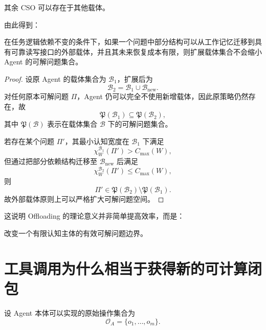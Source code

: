 其余 CSO 可以存在于其他载体。

由此得到：

\begin{theorem}[载体扩展定理]
在任务逻辑依赖不变的条件下，如果一个问题中部分结构可以从工作记忆迁移到具有可靠读写接口的外部载体，并且其未来恢复成本有限，则扩展载体集合不会缩小 Agent 的可解问题集合。
\end{theorem}

\begin{proof}
设原 Agent 的载体集合为 $\mathcal B_1$，扩展后为
\begin{equation}
\mathcal B_2
=
\mathcal B_1\cup\mathcal B_{\mathrm{new}}.
\end{equation}
对任何原本可解问题 $\Pi$，Agent 仍可以完全不使用新增载体，因此原策略仍然存在，故
\begin{equation}
\mathfrak P(\mathcal B_1)
\subseteq
\mathfrak P(\mathcal B_2),
\end{equation}
其中 $\mathfrak P(\mathcal B)$ 表示在载体集合 $\mathcal B$ 下的可解问题集合。

若存在某个问题 $\Pi'$，其最小认知宽度在 $\mathcal B_1$ 下满足
\begin{equation}
\chi_W^{\mathcal B_1}(\Pi')
>
C_{\max}(W),
\end{equation}
但通过把部分依赖结构迁移至 $\mathcal B_{\mathrm{new}}$ 后满足
\begin{equation}
\chi_W^{\mathcal B_2}(\Pi')
\leq
C_{\max}(W),
\end{equation}
则
\begin{equation}
\Pi'
\in
\mathfrak P(\mathcal B_2)
\setminus
\mathfrak P(\mathcal B_1).
\end{equation}
故外部载体原则上可以严格扩大可解问题空间。
\end{proof}

这说明 Offloading 的理论意义并非简单提高效率，而是：

\begin{statementbox}
改变一个有限认知主体的有效可解问题边界。
\end{statementbox}

\section{工具调用为什么相当于获得新的可计算闭包}

设 Agent 本体可以实现的原始操作集合为
\begin{equation}
\mathcal O_A
=
\{o_1,\ldots,o_m\}.
\end{equation}

